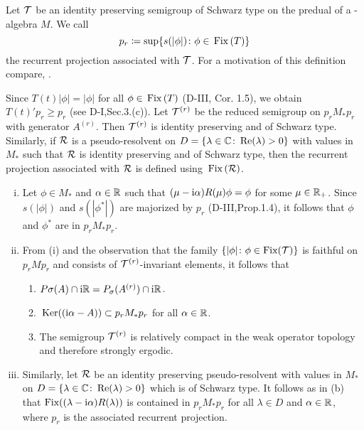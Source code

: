 Let $\mathcal{T}$ be an identity preserving semigroup of Schwarz type on the predual of a \WA-algebra $M$.
We call
\[
p_{r} \coloneqq \sup\{s(|\phi|) \colon \phi \in \mathop{}\mathrm{Fix}\left(T\right)\}
\]
the recurrent projection associated with $\mathcal{T}$.
For a motivation of this definition compare, \eg \citet[Section 6.3]{davies:1976}.

Since $T(t)|\phi| = |\phi|$ for all $\phi \in \mathop{}\mathrm{Fix}\left(T\right)$ (D-III, Cor. 1.5), we obtain $T(t)'p_{r} \geq p_{r}$ (see D-I,Sec.3.(c)).
Let $\mathcal{T}^{(r)}$ be the reduced semigroup on $p_{r}M_{*}p_{r}$ with generator $A^{(r)}$.
Then $\mathcal{T}^{(r)}$ is identity preserving and of Schwarz type.
Similarly, if $\mathcal{R}$ is a pseudo-resolvent on $D = \{\lambda \in \mathbb{C} \colon \mathop{}\!\mathrm{Re}(\lambda) > 0\}$ with values in $M_{*}$ such that $\mathcal{R}$ is identity preserving and of Schwarz type, then the recurrent projection associated with $\mathcal{R}$ is defined using $\mathop{}\mathrm{Fix}\left(\mathcal{R}\right)$.
\begin{remark}\label{rem:d4-3.2}
\begin{enumerate}[(i), wide]

\item\label{item:d4-3.2-i}
Let $\phi \in M_{*}$ and $\alpha \in \mathbb{R}$ such that $(\mu - \mathrm{i}\alpha)R(\mu)\phi = \phi$ for some $\mu \in \mathbb{R}_{+}$.
Since $s(|\phi|)$ and $s(|\phi^{*}|)$ are majorized by $p_{r}$ (D-III,Prop.1.4), it follows that $\phi$ and $\phi^{*}$ are in $p_{r}M_{*}p_{r}$.

\item\label{item:d4-3.2-ii}
From (i) and the observation that the family $\{|\phi| \colon \phi \in \text{Fix}(\mathcal{T})\}$ is
faithful on $p_{r}Mp_{r}$ and consists of $\mathcal{T}^{(r)}$-invariant elements, it follows that
\begin{enumerate}[--]
\item
$P\sigma(A) \cap \mathrm{i}\mathbb{R} = P_{\sigma}(A^{(r)}) \cap \mathrm{i}\mathbb{R}$.

\item
$\mathop{}\mathrm{Ker}((\mathrm{i}\alpha - A)) \subset p_{r}M_{*}p_{r}$ for all $\alpha \in \mathbb{R}$.

\item
The semigroup $\mathcal{T}^{(r)}$ is relatively compact in the weak operator topology and therefore strongly ergodic.
\end{enumerate}


\item\label{item:d4-3.2-iii}
Similarly, let $\mathcal{R}$ be an identity preserving pseudo-resolvent with values in $M_{*}$ on $D = \{\lambda \in \mathbb{C} \colon \mathop{}\!\mathrm{Re}(\lambda) > 0\}$ which is of Schwarz type.
It follows as in (b) that $\text{Fix}((\lambda - \mathrm{i}\alpha)R(\lambda))$ is contained in $p_{r}M_{*}p_{r}$ for all $\lambda \in D$ and $\alpha \in \mathbb{R}$, where $p_{r}$ is the associated recurrent projection.
\end{enumerate}
\end{remark}
